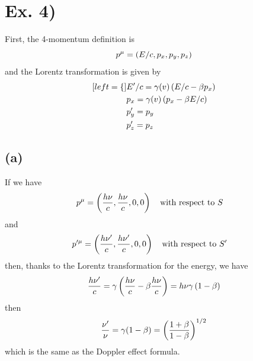 \documentclass[oneside, 10pt, notitlepage]{book}
\begin{document}
\section*{Ex. 4)}

First, the 4-momentum definition is
\begin{equation}
    p^{\mu} = \left(E/c,p_x,p_y,p_z\right)
\end{equation}
and the Lorentz transformation is given by
\begin{subequations}
    \begin{align}[left = \empheqlbrace\,]
    & E'/c = \gamma(v)\lr{E/c - \beta p_x} \\
	& p_x = \gamma(v)\lr{p_x - \beta E/c} \\
	& p'_y= p_y \\
	& p'_z = p_z
    \end{align}
\end{subequations}

\subsection*{(a)}
If we have
\begin{equation}
    p^{\mu} = \lr{\frac{h\nu}{c},\frac{h\nu}{c},0,0} \qq{with respect to \(S\)}
\end{equation}
and
\begin{equation}
    p'^{\mu} = \lr{\frac{h\nu'}{c}, \frac{h\nu'}{c},0,0} \qq{with respect to \(S'\)}
\end{equation}
then, thanks to the Lorentz transformation for the energy, we have
\begin{equation}
    \frac{h\nu'}{c} = \gamma \left( \frac{h\nu}{c} - \beta \frac{h\nu}{c}\right) = h \nu \gamma \left(1-\beta\right)
\end{equation}
then
\begin{equation}
    \frac{\nu'}{\nu} = \gamma (1-\beta) = \left(\frac{1+\beta}{1-\beta}\right)^{1/2}
\end{equation}
which is the same as the Doppler effect formula.
\end{document}
